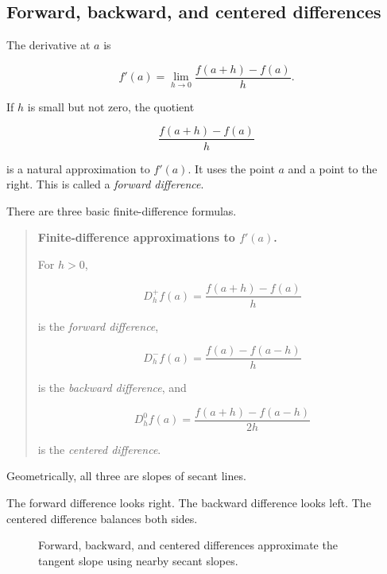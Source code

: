 \subsection{Forward, backward, and centered differences}
\label{subsec:forward-backward-centered-differences}

The derivative at \(a\) is

\[
f'(a)=\lim_{h\to0}\frac{f(a+h)-f(a)}{h}.
\]

If \(h\) is small but not zero, the quotient

\[
\frac{f(a+h)-f(a)}{h}
\]

is a natural approximation to \(f'(a)\).  It uses the point \(a\) and a point to the right.
This is called a \emph{forward difference}.

There are three basic finite-difference formulas.

\begin{quote}
\textbf{Finite-difference approximations to \(f'(a)\).}

For \(h>0\),

\[
\boxed{
D_h^+f(a)=\frac{f(a+h)-f(a)}{h}
}
\]

is the \emph{forward difference},

\[
\boxed{
D_h^-f(a)=\frac{f(a)-f(a-h)}{h}
}
\]

is the \emph{backward difference}, and

\[
\boxed{
D_h^0f(a)=\frac{f(a+h)-f(a-h)}{2h}
}
\]

is the \emph{centered difference}.
\end{quote}

Geometrically, all three are slopes of secant lines.

The forward difference looks right.  The backward difference looks left.  The centered
difference balances both sides.

\begin{figure}[h]
\centering
{}
\caption{Forward, backward, and centered differences approximate the tangent slope using nearby secant slopes.}
\label{fig:finite-difference-secants}
\end{figure}

